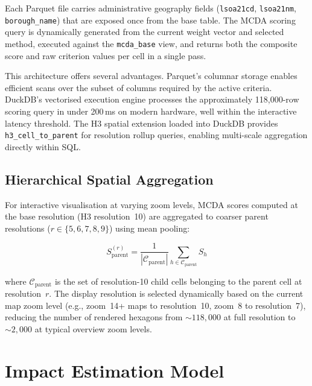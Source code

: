 \noindent Each Parquet file carries administrative geography fields (\texttt{lsoa21cd}, \texttt{lsoa21nm}, \texttt{borough\_name}) that are exposed once from the base table. The MCDA scoring query is dynamically generated from the current weight vector and selected method, executed against the \texttt{mcda\_base} view, and returns both the composite score and raw criterion values per cell in a single pass.

This architecture offers several advantages. Parquet's columnar storage enables efficient scans over the subset of columns required by the active criteria. DuckDB's vectorised execution engine processes the approximately 118,000-row scoring query in under 200\,ms on modern hardware, well within the interactive latency threshold. The H3 spatial extension loaded into DuckDB provides \texttt{h3\_cell\_to\_parent} for resolution rollup queries, enabling multi-scale aggregation directly within SQL.

\subsection{Hierarchical Spatial Aggregation}
\label{sec:aggregation}

For interactive visualisation at varying zoom levels, MCDA scores computed at the base resolution (H3 resolution~10) are aggregated to coarser parent resolutions ($r \in \{5, 6, 7, 8, 9\}$) using mean pooling:

\begin{equation}
S_{\text{parent}}^{(r)} = \frac{1}{|\mathcal{C}_{\text{parent}}|} \sum_{h \in \mathcal{C}_{\text{parent}}} S_h
\end{equation}

\noindent where $\mathcal{C}_{\text{parent}}$ is the set of resolution-10 child cells belonging to the parent cell at resolution~$r$. The display resolution is selected dynamically based on the current map zoom level (e.g., zoom~14+ maps to resolution~10, zoom~8 to resolution~7), reducing the number of rendered hexagons from $\sim\!118{,}000$ at full resolution to $\sim\!2{,}000$ at typical overview zoom levels.


\section{Impact Estimation Model}
\label{sec:impact}

